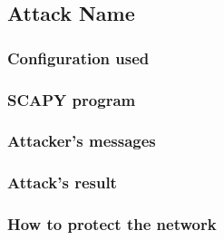 \subsection{Attack Name}
\subsubsection*{Configuration used}

\subsubsection*{SCAPY program}
%

\subsubsection*{Attacker's messages}

\subsubsection*{Attack's result}


\subsubsection*{How to protect the network}

